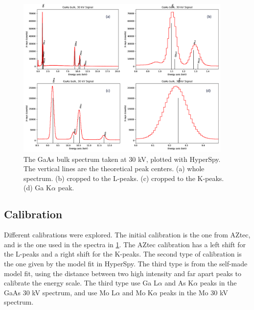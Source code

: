 \begin{figure}[p]
    \centering
    \includegraphics[width=0.95\textwidth]{figures/GaAs30kV_HS.png}
    \caption{
        The GaAs bulk spectrum taken at 30 kV, plotted with HyperSpy.
        The vertical lines are the theoretical peak centers.%
        (a) whole spectrum.
        (b) cropped to the L-peaks.
        (c) cropped to the K-peaks.
        (d) Ga K$\alpha$ peak.
    }
    \label{fig:GaAs30kV_HS}
\end{figure}






\subsection{Calibration}
\label{sec:results:qualitative:calibration}

Different calibrations were explored.
The initial calibration is the one from AZtec, and is the one used in the spectra in \cref{fig:GaAs30kV_HS}.
The AZtec calibration has a left shift for the L-peaks and a right shift for the K-peaks.
The second type of calibration is the one given by the model fit in HyperSpy.
The third type is from the self-made model fit, using the distance between two high intensity and far apart peaks to calibrate the energy scale.
The third type use Ga L$\alpha$ and As K$\alpha$ peaks in the GaAs 30 kV spectrum, and use Mo L$\alpha$ and Mo K$\alpha$ peaks in the Mo 30 kV spectrum.

